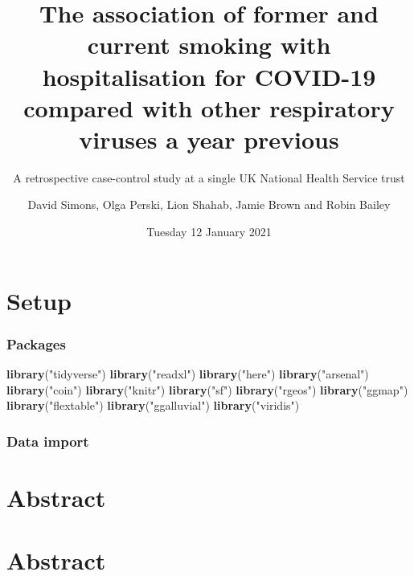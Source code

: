 \documentclass[
]{article}
\title{The association of former and current smoking with hospitalisation for
COVID-19 compared with other respiratory viruses a year previous}
\subtitle{A retrospective case-control study at a single UK National Health
Service trust}
\author{David Simons, Olga Perski, Lion Shahab, Jamie Brown and Robin Bailey}
\date{Tuesday 12 January 2021}
\newenvironment{Shaded}{\begin{snugshade}}{\end{snugshade}}
\newcommand{\KeywordTok}[1]{\textcolor[rgb]{0.13,0.29,0.53}{\textbf{#1}}}
\newcommand{\NormalTok}[1]{#1}
\newcommand{\StringTok}[1]{\textcolor[rgb]{0.31,0.60,0.02}{#1}}
\begin{document}
\maketitle

\hypertarget{setup}{%
\section{\texorpdfstring{\textbf{Setup}}{Setup}}\label{setup}}

\hypertarget{packages}{%
\subsubsection{Packages}\label{packages}}

\begin{Shaded}
\begin{Highlighting}[]
\KeywordTok{library}\NormalTok{(}\StringTok{"tidyverse"}\NormalTok{)}
\KeywordTok{library}\NormalTok{(}\StringTok{"readxl"}\NormalTok{)}
\KeywordTok{library}\NormalTok{(}\StringTok{"here"}\NormalTok{)}
\KeywordTok{library}\NormalTok{(}\StringTok{"arsenal"}\NormalTok{)}
\KeywordTok{library}\NormalTok{(}\StringTok{"coin"}\NormalTok{)}
\KeywordTok{library}\NormalTok{(}\StringTok{"knitr"}\NormalTok{)}
\KeywordTok{library}\NormalTok{(}\StringTok{"sf"}\NormalTok{)}
\KeywordTok{library}\NormalTok{(}\StringTok{"rgeos"}\NormalTok{)}
\KeywordTok{library}\NormalTok{(}\StringTok{"ggmap"}\NormalTok{)}
\KeywordTok{library}\NormalTok{(}\StringTok{"flextable"}\NormalTok{)}
\KeywordTok{library}\NormalTok{(}\StringTok{"ggalluvial"}\NormalTok{)}
\KeywordTok{library}\NormalTok{(}\StringTok{"viridis"}\NormalTok{)}
\end{Highlighting}
\end{Shaded}

\hypertarget{data-import}{%
\subsubsection{Data import}\label{data-import}}

\hypertarget{abstract}{%
\section{\texorpdfstring{\textbf{Abstract}}{Abstract}}\label{abstract}}

\hypertarget{abstract-1}{%
\section{\texorpdfstring{\textbf{Abstract}}{Abstract}}\label{abstract-1}}
\end{document}
